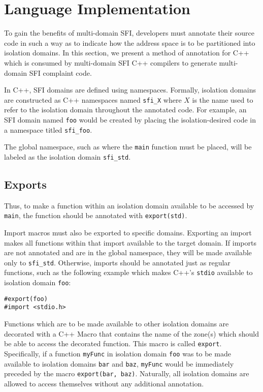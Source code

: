 \documentclass[12pt]{article}
\begin{document}
\section{Language Implementation}

To gain the benefits of multi-domain SFI, developers must annotate their source code in such a way as to indicate how the address space is to be partitioned into isolation domains. In this section, we present a method of annotation for C++ which is consumed by multi-domain SFI C++ compilers to generate multi-domain SFI complaint code.

In C++, SFI domains are defined using namespaces. Formally, isolation domains are constructed as C++ namespaces named \texttt{sfi\_X} where $X$ is the name used to refer to the isolation domain throughout the annotated code. For example, an SFI domain named \texttt{foo} would be created by placing the isolation-desired code in a namespace titled \texttt{sfi\_foo}.

The global namespace, such as where the \texttt{main} function must be placed, will be labeled as the isolation domain \texttt{sfi\_std}.

\subsection{Exports} \label{exports}

Thus, to make a function within an isolation domain available to be accessed by \texttt{main}, the function should be annotated with \texttt{export(std)}.

Import macros must also be exported to specific domains. Exporting an import makes all functions within that import available to the target domain. If imports are not annotated and are in the global namespace, they will be made available only to \texttt{sfi\_std}. Otherwise, imports should be annotated just as regular functions, such as the following example which makes C++'s \texttt{stdio} available to isolation domain \texttt{foo}:
\begin{verbatim}
#export(foo)
#import <stdio.h>
\end{verbatim}

Functions which are to be made available to other isolation domains are decorated with a C++ Macro that contains the name of the zone(s) which should be able to access the decorated function. This macro is called \texttt{export}. Specifically, if a function \texttt{myFunc} in isolation domain \texttt{foo} was to be made available to isolation domains \texttt{bar} and \texttt{baz}, \texttt{myFunc} would be immediately preceded by the macro \texttt{export(bar, baz)}. Naturally, all isolation domains are allowed to access themselves without any additional annotation.
\end{document}
